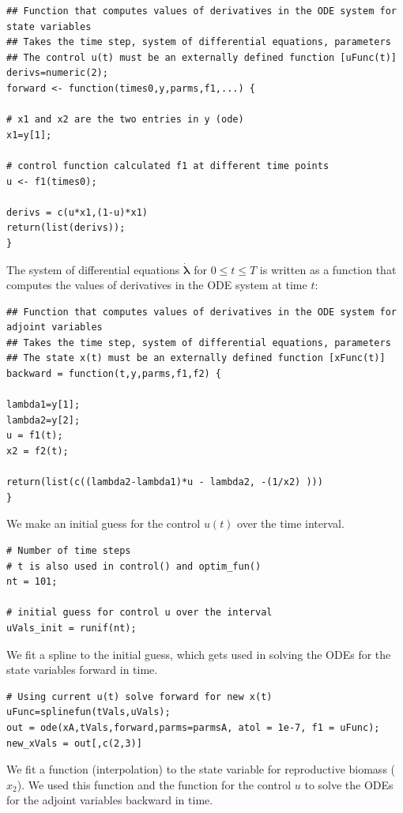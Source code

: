 \documentclass[12pt, oneside]{article}   	%
\begin{document}
\begin{lstlisting}
## Function that computes values of derivatives in the ODE system for state variables
## Takes the time step, system of differential equations, parameters
## The control u(t) must be an externally defined function [uFunc(t)]
derivs=numeric(2); 
forward <- function(times0,y,parms,f1,...) {

# x1 and x2 are the two entries in y (ode)
x1=y[1]; 

# control function calculated f1 at different time points
u <- f1(times0);

derivs = c(u*x1,(1-u)*x1) 
return(list(derivs));
}
\end{lstlisting}

\noindent The system of differential equations $\dot{\bm{\lambda}}$ for $0\leq t \leq T$ is written as a function that computes the values of derivatives in the ODE system at time $t$:

\begin{lstlisting}
## Function that computes values of derivatives in the ODE system for adjoint variables
## Takes the time step, system of differential equations, parameters
## The state x(t) must be an externally defined function [xFunc(t)]
backward = function(t,y,parms,f1,f2) {

lambda1=y[1];
lambda2=y[2];
u = f1(t);
x2 = f2(t);

return(list(c((lambda2-lambda1)*u - lambda2, -(1/x2) )))
}
\end{lstlisting}

\noindent We make an initial guess for the control $u(t)$ over the time interval. 

\begin{lstlisting}
# Number of time steps
# t is also used in control() and optim_fun()
nt = 101;

# initial guess for control u over the interval
uVals_init = runif(nt);
\end{lstlisting}

\noindent We fit a spline to the initial guess, which gets used in solving the ODEs for the state variables forward in time.

\begin{lstlisting}
# Using current u(t) solve forward for new x(t)
uFunc=splinefun(tVals,uVals); 
out = ode(xA,tVals,forward,parms=parmsA, atol = 1e-7, f1 = uFunc); 
new_xVals = out[,c(2,3)] 
\end{lstlisting}

\noindent We fit a function (interpolation) to the state variable for reproductive biomass ($x_2$). We used this function and the function for the control $u$ to solve the ODEs for the adjoint variables backward in time.
\end{document}

